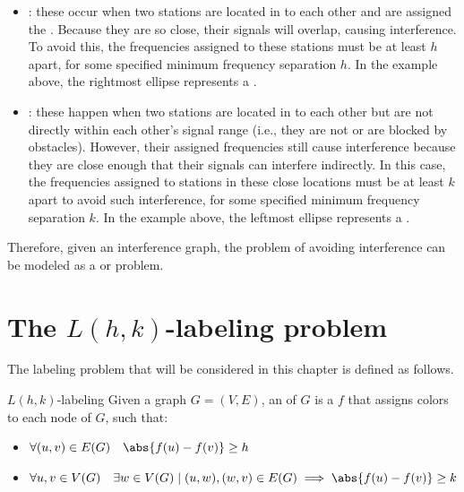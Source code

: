 \documentclass[a4paper, 12pt]{report}
\begin{document}
    \begin{itemize}
        \item {}: these occur when two stations are located in  to each other and are assigned the . Because they are so close, their signals will overlap, causing interference. To avoid this, the frequencies assigned to these stations must be at least $h$ apart, for some specified minimum frequency separation $h$. In the example above, the rightmost ellipse represents a .
        \item {}: these happen when two stations are located in  to each other but are not directly within each other's signal range (i.e., they are not  or are blocked by obstacles). However, their assigned frequencies still cause interference because they are close enough that their signals can interfere indirectly. In this case, the frequencies assigned to stations in these close locations must be at least $k$ apart to avoid such interference, for some specified minimum frequency separation $k$. In the example above, the leftmost ellipse represents a .
    \end{itemize}

    Therefore, given an interference graph, the problem of avoiding interference can be modeled as a  or  problem.

    \section{The $L(h, k)$-labeling problem}

    The labeling problem that will be considered in this chapter is defined as follows.

    \begin{frameddefn}{$L(h, k)$-labeling}
        Given a graph $G= (V, E)$, an  of $G$ is a  $f$ that assigns colors to each node of $G$, such that:

        \begin{itemize}
            \item $\forall (u, v) \in E(G) \quad \abs{f(u) - f(v)} \ge h$
            \item $\forall u, v \in V(G) \quad \exists w \in V(G) \mid (u, w), (w, v) \in E(G) \implies \abs{f(u) - f(v)} \ge k$
        \end{itemize}
    \end{frameddefn}
\end{document}
